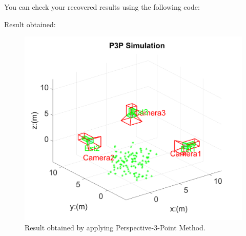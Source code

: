 \documentclass[a4paper]{article}
\begin{document}
You can check your recovered results using the following code:

Result obtained:
\begin{figure}[!b]
\centering
\includegraphics[scale=0.9]{figures/p3p.png}
\caption{Result obtained by applying Perspective-$3$-Point Method.}
\end{figure}


%
%



 
 

\end{document}
